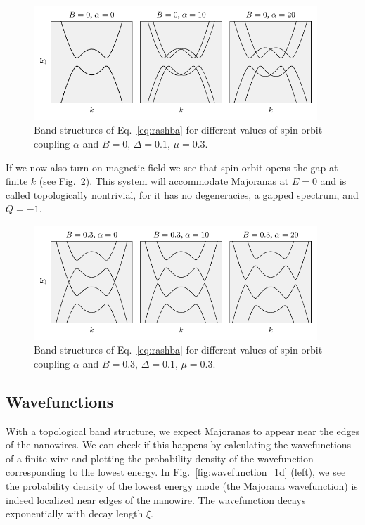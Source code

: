\begin{figure}
\centering{}\includegraphics[width=0.95\textwidth]{chapter_introduction/figures/SO_no_zeeman.pdf}
\caption{Band structures of Eq.~\ref{eq:rashba} for different values of spin-orbit coupling $\alpha$ and $B=0$, $\Delta=0.1$, $\mu=0.3$.
\label{fig:SO_no_zeeman}}
\end{figure}
If we now also turn on magnetic field we see that spin-orbit opens the gap at finite $k$ (see Fig.~\ref{fig:SO_and_zeeman}).
This system will accommodate Majoranas at $E=0$ and is called topologically nontrivial, for it has no degeneracies, a gapped spectrum, and $Q=-1$.

\begin{figure}
\centering{}\includegraphics[width=0.95\textwidth]{chapter_introduction/figures/SO_and_zeeman.pdf}
\caption{Band structures of Eq.~\ref{eq:rashba} for different values of spin-orbit coupling $\alpha$ and $B=0.3$, $\Delta=0.1$, $\mu=0.3$.
\label{fig:SO_and_zeeman}}
\end{figure}


\subsection{Wavefunctions}

With a topological band structure, we expect Majoranas to appear near
the edges of the nanowires.
We can check if this happens by calculating the wavefunctions of a finite wire and plotting the probability density of the wavefunction corresponding to the lowest energy.
In Fig.~\ref{fig:wavefunction_1d} (left), we see the probability density of the lowest energy mode (the Majorana wavefunction) is indeed localized near edges of the nanowire.
The wavefunction decays exponentially with decay length $\xi$.

